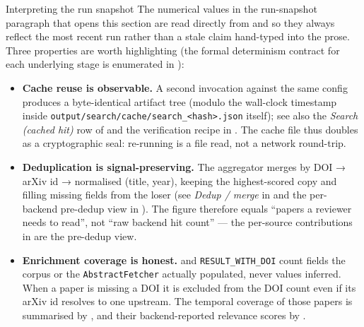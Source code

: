 \documentclass[
  ignorenonframetext,
]{beamer}
\providecommand{\tightlist}{%
  \setlength{\itemsep}{0pt}\setlength{\parskip}{0pt}}
\begin{document}
\begin{frame}{Interpreting the run snapshot}
\protect{}\label{interpreting-the-run-snapshot}
The numerical values in the run-snapshot paragraph that opens this
section are read directly from  and
 so they always reflect
the most recent run rather than a stale claim hand-typed into the prose.
Three properties are worth highlighting (the formal determinism contract
for each underlying stage is enumerated in ):

\begin{itemize}
\tightlist
\item
  \textbf{Cache reuse is observable.} A second invocation against the
  same config produces a byte-identical artifact tree (modulo the
  wall-clock timestamp inside
  \texttt{output/search/cache/search\_\textless{}hash\textgreater{}.json}
  itself); see also the \emph{Search (cached hit)} row of
   and the verification recipe in
  . The cache file thus doubles as a
  cryptographic seal: re-running is a file read, not a network
  round-trip.
\item
  \textbf{Deduplication is signal-preserving.} The aggregator merges by
  DOI → arXiv id → normalised (title, year), keeping the highest-scored
  copy and filling missing fields from the loser (see \emph{Dedup /
  merge} in  and the per-backend pre-dedup view in
  ). The 
  figure therefore equals ``papers a reviewer needs to read'', not ``raw
  backend hit count'' --- the per-source contributions in
   are the pre-dedup view.
\item
  \textbf{Enrichment coverage is honest.}
   and \texttt{RESULT\_WITH\_DOI} count
  fields the corpus or the \texttt{AbstractFetcher} actually populated,
  never values inferred. When a paper is missing a DOI it is excluded
  from the DOI count even if its arXiv id resolves to one upstream. The
  temporal coverage of those papers is summarised by
  , and their backend-reported relevance
  scores by .
\end{itemize}
\end{frame}
\end{document}
